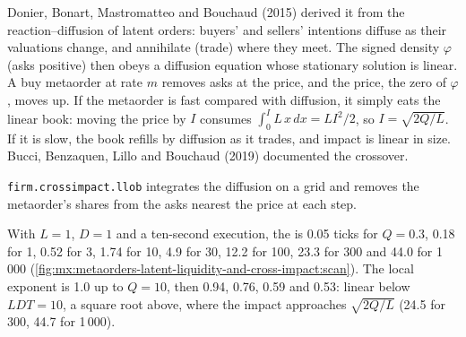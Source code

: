 Donier, Bonart, Mastromatteo and Bouchaud (2015) derived it from the reaction--diffusion of latent orders: buyers' and sellers' intentions diffuse as
their valuations change, and annihilate (trade) where they meet. The signed density $\varphi$ (asks positive) then obeys a diffusion equation whose
stationary solution is linear. A buy metaorder at rate $m$ removes asks at the price, and the price, the zero of $\varphi$, moves up. If the metaorder is
fast compared with diffusion, it simply eats the linear book: moving the price by $I$ consumes $\int_0^IL\,x\,dx=LI^2/2$, so $I=\sqrt{2Q/L}$. If it is
slow, the book refills by diffusion as it trades, and impact is linear in size. Bucci, Benzaquen, Lillo and Bouchaud (2019) documented the crossover.

\texttt{firm.crossimpact.llob} integrates the diffusion on a grid and removes the metaorder's shares from the asks nearest the price at each step.

\label{lst:mx:metaorders-latent-liquidity-and-cross-impact:llob}

With $L=1$, $D=1$ and a ten-second execution, the  is 0.05 ticks for $Q=0.3$, 0.18 for 1, 0.52 for 3, 1.74 for 10, 4.9 for 30, 12.2 for 100, 23.3 for 300 and
44.0 for 1\,000 (\cref{fig:mx:metaorders-latent-liquidity-and-cross-impact:scan}). The local exponent is 1.0 up to $Q=10$, then 0.94, 0.76, 0.59 and 0.53: linear
below $LDT=10$, a square root above, where the impact approaches $\sqrt{2Q/L}$ (24.5 for 300, 44.7 for 1\,000).

\begin{omfigure}

\label{fig:mx:metaorders-latent-liquidity-and-cross-impact:scan}
\end{omfigure}

